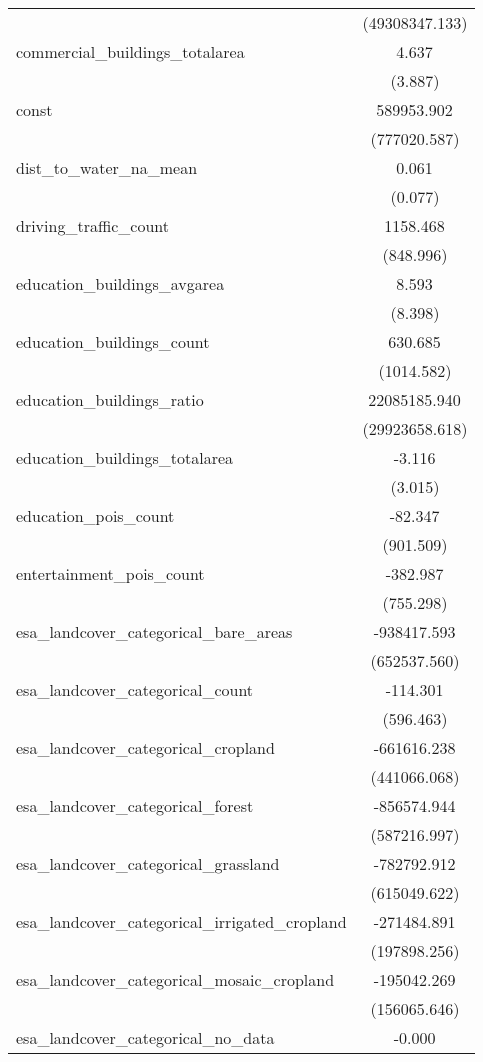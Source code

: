 \begin{table}[!htbp]
\begin{tabular}{@{\extracolsep{5pt}}lc}
  & (49308347.133) \\
 commercial_buildings_totalarea & 4.637$^{}$ \\
  & (3.887) \\
 const & 589953.902$^{}$ \\
  & (777020.587) \\
 dist_to_water_na_mean & 0.061$^{}$ \\
  & (0.077) \\
 driving_traffic_count & 1158.468$^{}$ \\
  & (848.996) \\
 education_buildings_avgarea & 8.593$^{}$ \\
  & (8.398) \\
 education_buildings_count & 630.685$^{}$ \\
  & (1014.582) \\
 education_buildings_ratio & 22085185.940$^{}$ \\
  & (29923658.618) \\
 education_buildings_totalarea & -3.116$^{}$ \\
  & (3.015) \\
 education_pois_count & -82.347$^{}$ \\
  & (901.509) \\
 entertainment_pois_count & -382.987$^{}$ \\
  & (755.298) \\
 esa_landcover_categorical_bare_areas & -938417.593$^{}$ \\
  & (652537.560) \\
 esa_landcover_categorical_count & -114.301$^{}$ \\
  & (596.463) \\
 esa_landcover_categorical_cropland & -661616.238$^{}$ \\
  & (441066.068) \\
 esa_landcover_categorical_forest & -856574.944$^{}$ \\
  & (587216.997) \\
 esa_landcover_categorical_grassland & -782792.912$^{}$ \\
  & (615049.622) \\
 esa_landcover_categorical_irrigated_cropland & -271484.891$^{}$ \\
  & (197898.256) \\
 esa_landcover_categorical_mosaic_cropland & -195042.269$^{}$ \\
  & (156065.646) \\
 esa_landcover_categorical_no_data & -0.000$^{}$ \\

\end{tabular}
\end{table}
